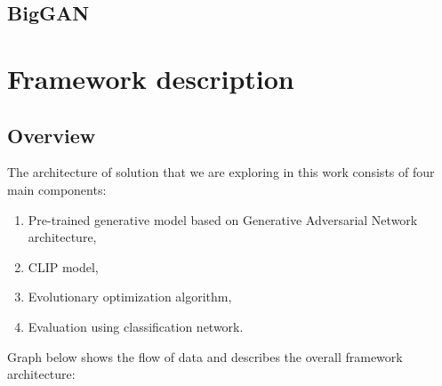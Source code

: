 \documentclass[12pt,a4paper,openany]{book}
\begin{document}





\section{BigGAN}

\chapter{Framework description}

\section{Overview}

The architecture of solution that we are exploring in this work consists of four main components:
\begin{enumerate}
\item Pre-trained generative model based on Generative Adversarial Network architecture,
\item CLIP model,
\item Evolutionary optimization algorithm,
\item Evaluation using classification network.
\end{enumerate}
Graph below shows the flow of data and describes the overall framework architecture:\\
\end{document}
